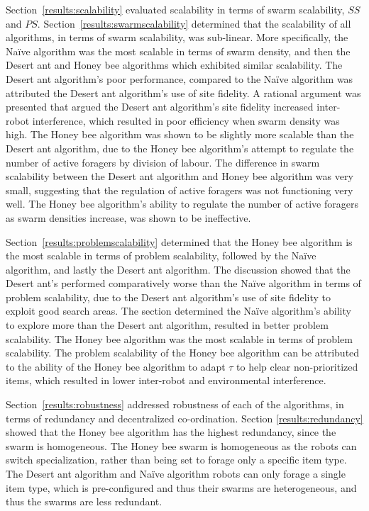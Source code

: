 Section~\ref{results:scalability} evaluated scalability in terms of swarm scalability, $SS$ and $PS$. Section~\ref{results:swarmscalability} determined that the scalability of all algorithms, in terms of swarm scalability, was sub-linear. More specifically, the Na\"ive algorithm was the most scalable in terms of swarm density, and then the Desert ant and Honey bee algorithms which exhibited similar scalability. The Desert ant algorithm's poor performance, compared to the Na\"ive algorithm was attributed the Desert ant algorithm's use of site fidelity. A rational argument was presented that argued the Desert ant algorithm's site fidelity increased inter-robot interference, which resulted in poor efficiency when swarm density was high. The Honey bee algorithm was shown to be slightly more scalable than the Desert ant algorithm, due to the Honey bee algorithm's attempt to regulate the number of active foragers by division of labour. The difference in swarm scalability between the Desert ant algorithm and Honey bee algorithm was very small, suggesting that the regulation of active foragers was not functioning very well. The Honey bee algorithm's ability to regulate the number of active foragers as swarm densities increase, was shown to be ineffective. 

Section~\ref{results:problemscalability} determined that the Honey bee algorithm is the most scalable in terms of problem scalability, followed by the Na\"ive algorithm, and lastly the Desert ant algorithm. The discussion showed that the Desert ant's performed comparatively worse than the Na\"ive algorithm in terms of problem scalability, due to the Desert ant algorithm's use of site fidelity to exploit good search areas. The section determined the Na\"ive algorithm's ability to explore more than the Desert ant algorithm, resulted in better problem scalability. The Honey bee algorithm was the most scalable in terms of problem scalability. The problem scalability of the Honey bee algorithm can be attributed to the ability of the Honey bee algorithm to adapt $\tau$ to help clear non-prioritized items, which resulted in lower inter-robot and environmental interference.

Section~\ref{results:robustness} addressed robustness of each of the algorithms, in terms of redundancy and decentralized co-ordination. Section \ref{results:redundancy} showed that the Honey bee algorithm has the highest redundancy, since the swarm is homogeneous. The Honey bee swarm is homogeneous as the robots can switch specialization, rather than being set to forage only a specific item type. The Desert ant algorithm and Na\"ive algorithm robots can only forage a single item type, which is pre-configured and thus their swarms are heterogeneous, and thus the swarms are less redundant.


